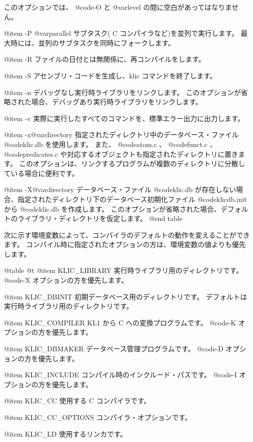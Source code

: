 {{{{このオプションでは、 @code{-O} と @var{level} の間に空白があってはなりません。

@item -P @var{parallel}
サブタスク( C コンパイラなど)を並列で実行します。
最大時には、並列のサブタスクを同時にフォークします。

@item -R
ファイルの日付とは無関係に、再コンパイルをします。

@item -S
アセンブリ・コードを生成し、klic コマンドを終了します。

@item -n
デバッグなし実行時ライブラリをリンクします。
このオプションが省略された場合、デバッグあり実行時ライブラリをリンクします。

@item -v
実際に実行したすべてのコマンドを、標準エラー出力に出力します。

@item -x@var{directory}
指定されたディレクトリ中のデータベース・ファイル @code{klic.db} を使用します。
また、 @code{atom.c} 、 @code{funct.c} 、 @code{predicates.c} や対応するオブジェクトも指定されたディレクトリに置きます。
このオプションは、リンクするプログラムが複数のディレクトリに分散している場合に便利です。

@item -X@var{directory}
データベース・ファイル @code{klic.db} が存在しない場合、指定されたディレクトリ下のデータベース初期化ファイル @code{klicdb.init} から @code{klic.db} を作成します。
このオプションが省略された場合、デフォルトのライブラリ・ディレクトリを仮定します。
@end table

次に示す環境変数によって、コンパイラのデフォルトの動作を変えることができます。
コンパイル時に指定されたオプションの方は、環境変数の値よりも優先します。

@table @t
@item KLIC_LIBRARY
実行時ライブラリ用のディレクトリです。
 @code{-X} オプションの方を優先します。

@item KLIC_DBINIT
初期データベース用のディレクトリです。
デフォルトは実行時ライブラリ用のディレクトリです。

@item KLIC_COMPILER
 KL1 から C への変換プログラムです。
 @code{-K} オプションの方を優先します。

@item KLIC_DBMAKER
データベース管理プログラムです。
 @code{-D} オプションの方を優先します。

@item KLIC_INCLUDE
コンパイル時のインクルード・パスです。
 @code{-I} オプションの方を優先します。

@item KLIC_CC
使用する C コンパイラです。

@item KLIC_CC_OPTIONS
コンパイラ・オプションです。

@item KLIC_LD
使用するリンカです。

}}}}
